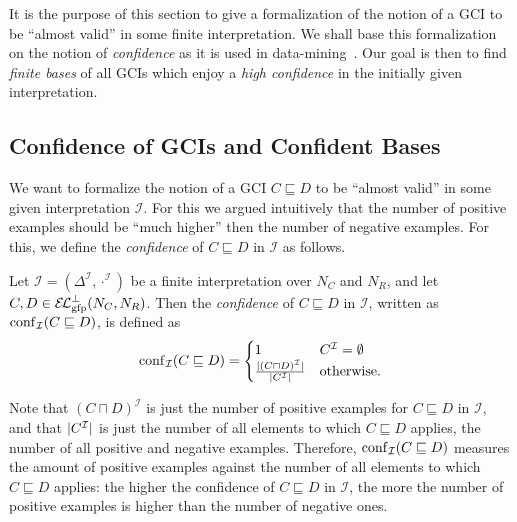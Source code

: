 It is the purpose of this section to give a formalization of the notion of a GCI to be
``almost valid'' in some finite interpretation.  We shall base this formalization on the
notion of \emph{confidence} as it is used in
data-mining~\cite{arules:agrawal:association-rules}.  Our goal is then to find
\emph{finite bases} of all GCIs which enjoy a \emph{high confidence} in the initially
given interpretation.

\subsection{Confidence of GCIs and Confident Bases}
\label{sec:conf-gcis-conf}

We want to formalize the notion of a GCI $C \sqsubseteq D$ to be ``almost valid'' in some
given interpretation $\mathcal{I}$.  For this we argued intuitively that the number of
positive examples should be ``much higher'' then the number of negative examples.  For
this, we define the \emph{confidence} of $C \sqsubseteq D$ in $\mathcal{I}$ as follows.

\begin{Definition}
  \label{def:gci-confidence}
  Let $\mathcal{I} = (\Delta^{\mathcal{I}}, \cdot^{\mathcal{I}})$ be a finite
  interpretation over $N_C$ and $N_R$, and let $C, D \in \ELgfpbot(N_C, N_R)$.  Then the
  \emph{confidence} of $C \sqsubseteq D$ in $\mathcal{I}$, written as
  $\operatorname{conf}_{\mathcal{I}}(C \sqsubseteq D)$, is defined as
  \begin{equation*}
    \operatorname{conf}_{\mathcal{I}}( C \sqsubseteq D ) =
    \begin{cases}
      1 & C^{\mathcal{I}} = \emptyset \\
      \frac{\lvert (C \sqcap D)^{\mathcal{I}} \rvert}{\lvert C^{\mathcal{I}} \rvert} & \text{otherwise.}
    \end{cases}
  \end{equation*}
\end{Definition}
Note that $(C \sqcap D)^{\mathcal{I}}$ is just the number of positive examples for $C
\sqsubseteq D$ in $\mathcal{I}$, and that $\lvert C^{\mathcal{I}}\rvert$ is just the number of
all elements to which $C \sqsubseteq D$ applies, \ie the number of all positive and
negative examples.  Therefore, $\operatorname{conf}_{\mathcal{I}}(C \sqsubseteq D)$ measures the amount
of positive examples against the number of all elements to which $C \sqsubseteq D$
applies: the higher the confidence of $C \sqsubseteq D$ in $\mathcal{I}$, the more the
number of positive examples is higher than the number of negative ones.

